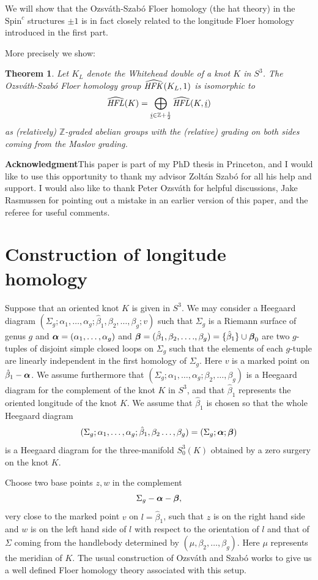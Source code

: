 \documentclass{gtart_h}
\newtheorem{thm}{Theorem}[section]
\theoremstyle{definition}
\newcommand{\ui}{\underline{i}}
\newcommand\alphas{\mbox{\boldmath$\alpha$}}
\newcommand\betas{\mbox{\boldmath$\beta$}}
\newcommand\HFK{\text{\it HFK\/}}
\newcommand\HFL{\text{\it HFL\/}}
\newcommand{\SpinC}{{\mathrm{Spin}}^c}
\begin{document}
We will show that the Ozsv\'ath-Szab\'o Floer homology (the hat theory)
in the $\SpinC$ structures $\pm 1$ is
in fact closely related to the longitude Floer homology introduced in
the first part.

More precisely we show:

\begin{thm}
{Let $K_L$ denote the Whitehead double of a knot $K$ in $S^3$. The
Ozsv\'ath-Szab\'o Floer homology group $\widehat{\HFK}(K_L,1)$ is
isomorphic to
 $$\widehat{\HFL}(K)=\bigoplus_{\ui\in \mathbb{Z}+\frac{1}{2}}\widehat{\HFL}(K,\ui)$$ as (relatively)
$\mathbb{Z}$-graded abelian groups with the (relative) grading on both sides coming from the
Maslov grading.}
\end{thm}


\textbf{Acknowledgment}\qua This paper is part of my PhD thesis in
Princeton, and I would like to use this opportunity to thank my
advisor Zolt\'an Szab\'o for all his help and support. I would also
like to thank Peter Ozsv\'ath for helpful discussions, Jake Rasmussen
for pointing out a mistake in an earlier version of this paper, and
the referee for useful comments.

\section{Construction of longitude homology}

Suppose that an oriented  knot $K$ is given in $S^3$. We may consider a Heegaard diagram
$(\Sigma_g;\alpha_1,\ldots,\alpha_g;\hat \beta_1,\beta_2,\ldots,\beta_g;v)$ such that
$\Sigma_g$ is a Riemann surface of genus $g$ and $\alphas=(\alpha_1,\ldots,\alpha_g)$
and $\betas=(\hat \beta_1,\beta_2,\ldots.,\beta_g)=\{\hat \beta_1\}\cup \betas_0$ are two $g$-tuples of disjoint
simple closed
loops on $\Sigma_g$ such that the elements of each $g$-tuple are linearly
independent in the first homology of $\Sigma_g$. Here $v$ is a marked point
on $\hat \beta_1 -\alphas$.
We assume furthermore that
$(\Sigma_g;\alpha_1,\ldots,\alpha_g;\beta_2,\ldots,\beta_g)$ is a Heegaard diagram
for the complement of the knot $K$ in $S^3$, and that $\hat \beta_1$ represents
the oriented longitude of the knot $K$. We assume that $\hat \beta_1$ is chosen so that
 the whole Heegaard diagram
$$(\Sigma_g;\alpha_1,\ldots,\alpha_g;\hat \beta_1,\beta_2\ldots,\beta_g)=(\Sigma_g;\alphas;\betas)$$
is a Heegaard diagram for the three-manifold $S^3_0(K)$ obtained by a zero surgery  on the knot $K$.

Choose two base points $z,w$ in the complement
$$\Sigma_g - \alphas-\betas,$$
very close to the marked point $v$ on $l=\hat \beta_1$, such that $z$ is on  the right
hand side and $w$ is on the left hand side of $l$ with respect to the
orientation of $l$ and that of $\Sigma$ coming from the handlebody determined
by $(\mu,\beta_2,\ldots,\beta_g)$. Here $\mu$ represents the meridian of $K$.
The usual construction of
Ozsv\'ath and Szab\'o works to give us a well defined Floer homology theory
associated with this setup.
\end{document}
